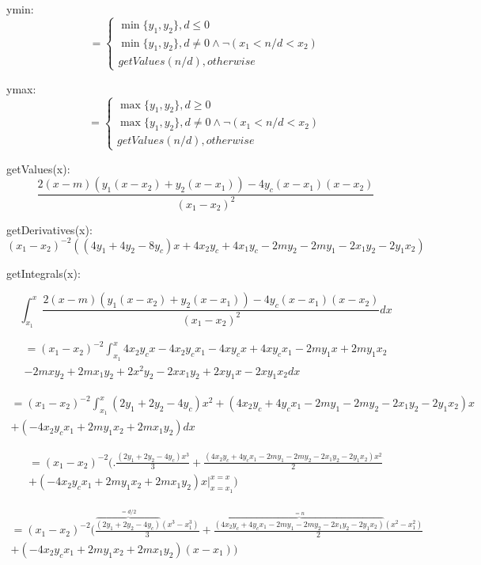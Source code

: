\documentclass{article}
\begin{document}
{ymin: $$=\begin{cases}
\min\{y_1,y_2\}, d\leq 0 \\
\min\{y_1,y_2\}, d\neq 0 \land \neg(x_1 < n/d < x_2) \\
getValues(n/d), otherwise
\end{cases}$$

ymax: $$=\begin{cases}
\max\{y_1,y_2\}, d\geq 0 \\
\max\{y_1,y_2\}, d\neq 0 \land \neg(x_1 < n/d < x_2) \\
getValues(n/d), otherwise
\end{cases}$$

getValues(x): $$\frac{2(x-m)(y_1(x-x_2)+y_2(x-x_1)) - 4y_c(x-x_1)(x-x_2)}{(x_1-x_2)^2}$$

getDerivatives(x): $$(x_1-x_2)^{-2} ((4y_1+4y_2-8y_c)x+4x_2y_c+4x_1y_c-2my_2-2my_1-2x_1y_2-2y_1x_2)$$

getIntegrals(x):

$$\int_{x_1}^x \frac{2(x-m)(y_1(x-x_2)+y_2(x-x_1)) - 4y_c(x-x_1)(x-x_2)}{(x_1-x_2)^2} dx$$

\begin{multline*}
=(x_1-x_2)^{-2}\int_{x_1}^x 4 x_2 y_c x - 4 x_2 y_c x_1 - 4 x y_c x + 4 x y_c x_1 - 2 m y_1 x + 2 m y_1 x_2 \\ - 2 m x y_2 + 2 m x_1 y_2 + 2 x^2 y_2 - 2 x x_1 y_2 + 2 x y_1 x - 2 x y_1 x_2 dx
\end{multline*}

\begin{multline*}
=(x_1-x_2)^{-2} \int_{x_1}^x (2y_1+2y_2-4y_c)x^2 + (4 x_2 y_c + 4 y_c x_1 - 2 m y_1 - 2 m y_2 - 2 x_1 y_2 - 2 y_1 x_2) x \\ + (-4 x_2 y_c x_1 + 2 m y_1 x_2 + 2 m x_1 y_2) dx
\end{multline*}

\begin{multline*}
=(x_1-x_2)^{-2} \biggl(\bigl.\frac{(2y_1+2y_2-4y_c)x^3}{3} + \frac{(4 x_2 y_c + 4 y_c x_1 - 2 m y_1 - 2 m y_2 - 2 x_1 y_2 - 2 y_1 x_2) x^2}{2} \\ + (-4 x_2 y_c x_1 + 2 m y_1 x_2 + 2 m x_1 y_2)x\bigr\vert _ {x=x_1} ^ {x=x}\biggr)
\end{multline*}

\begin{multline*}
=(x_1-x_2)^{-2} \biggl(\frac{\overbrace{(2y_1+2y_2-4y_c)}^{=d/2}(x^3-x_1^3)}{3} + \frac{\overbrace{(4 x_2 y_c + 4 y_c x_1 - 2 m y_1 - 2 m y_2 - 2 x_1 y_2 - 2 y_1 x_2)}^{=n} (x^2-x_1^2)}{2} \\ + (-4 x_2 y_c x_1 + 2 m y_1 x_2 + 2 m x_1 y_2)(x-x_1)\biggr)
\end{multline*}

}
\end{document}
